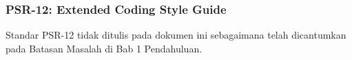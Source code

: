 \subsubsection{PSR-12: Extended Coding Style Guide}
\label{subsubsec:psr12}
Standar PSR-12 tidak ditulis pada dokumen ini sebagaimana telah dicantumkan pada Batasan Masalah di Bab 1 Pendahuluan.
\begin{comment}
	
\begin{itemize}
	\item (PSR-1201) Kode HARUS mengikuti semua aturan yang diuraikan dalam PSR-01.
	\item (PSR-1202) Istilah `StudlyCaps' di PSR-01 HARUS diartikan sebagai PascalCase di mana huruf pertama setiap kata menggunakan huruf kapital termasuk huruf paling pertama.
	\item (PSR-1203) Semua \textit{file} PHP HARUS menggunakan akhiran baris UnixLF (\textit{linefeed}) saja.
	\item (PSR-1204) Semua \textit{file} PHP HARUS diakhiri dengan baris yang tidak kosong, diakhiri dengan sebuah LF.
	\item (PSR-1205) \textit{Tag} penutup \verb|?>| HARUS dihilangkan dari \textit{file} yang hanya berisi PHP.
	\item (PSR-1206) TIDAK BOLEH ada \textit{hard limit} pada panjang baris.
	\item (PSR-1207) \textit{Soft limit} pada panjang baris HARUS 120 karakter.
	\item (PSR-1208) Tiap baris SEBAIKNYA TIDAK lebih dari 80 karakter; (PSR-12) baris-baris yang lebih panjang dari itu HARUS dipecah menjadi beberapa baris berikutnya yang masing-masing tidak lebih dari 80 karakter.
	\item (PSR-12) TIDAK BOLEH ada spasi tambahan di akhir baris.
	\item (PSR-12) Baris kosong BOLEH ditambahkan untuk mempermudah membaca kode dan menunjukkan blok-blok kode yang berhubungan kecuali jika dilarang secara eksplisit.
	\item (PSR-12) TIDAK BOLEH ada lebih dari satu \textit{statement} dalam satu baris.
	\item (PSR-12) Kode HARUS menggunakan indentasi sebanyak 4 spasi untuk setiap level indentasi, dan (PSR-12) TIDAK BOLEH menggunakan \textit{tab} untuk indentasi. 
	\item (PSR-12) Semua \textit{keywords} dan \textit{types} yang dicadangkan PHP HARUS ditulis dalam huruf kecil. \footnote{text}
	\item (PSR-12) Setiap jenis \textit{types} dan \textit{keywords} yang ditambahkan ke versi PHP mendatang HARUS menggunakan huruf kecil.
	\item (PSR-12) Bentuk pendek dari tipe \textit{keywords} HARUS digunakan, yaitu \verb|boolean| ditulis \verb|bool|, \verb|integer| ditulis \verb|int|, dan lain-lain. 
	\item (PSR-12)
	\item (PSR-12)
	\item (PSR-12)
	\item (PSR-12)
	\item (PSR-12)
	

\end{comment}
